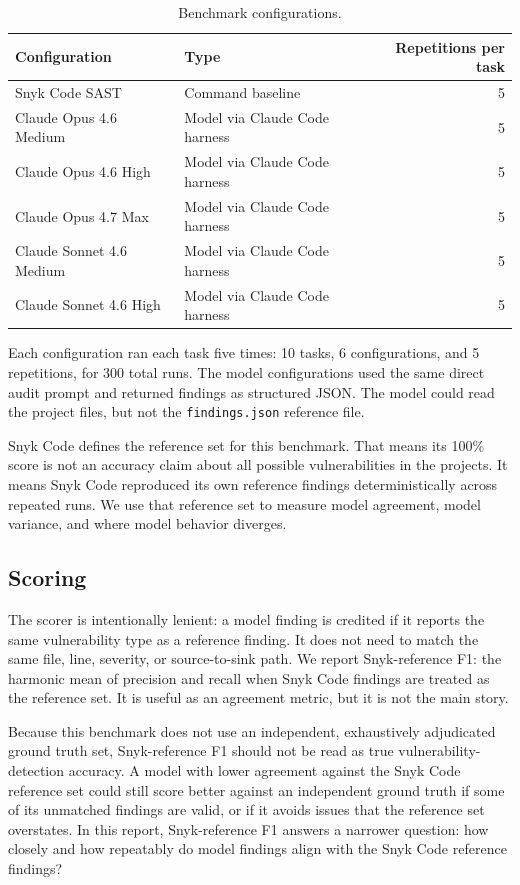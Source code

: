 \documentclass[11pt]{article}
\begin{document}
\begin{table}[htbp]
\centering
\caption{Benchmark configurations.}
\label{tab:configs}
\begin{tabular}{llr}
\toprule
Configuration & Type & Repetitions per task \\
\midrule
Snyk Code SAST & Command baseline & 5 \\
Claude Opus 4.6 Medium & Model via Claude Code harness & 5 \\
Claude Opus 4.6 High & Model via Claude Code harness & 5 \\
Claude Opus 4.7 Max & Model via Claude Code harness & 5 \\
Claude Sonnet 4.6 Medium & Model via Claude Code harness & 5 \\
Claude Sonnet 4.6 High & Model via Claude Code harness & 5 \\
\bottomrule
\end{tabular}
\end{table}

Each configuration ran each task five times: 10 tasks, 6 configurations, and 5 repetitions, for 300 total runs. The model configurations used the same direct audit prompt and returned findings as structured JSON. The model could read the project files, but not the \texttt{findings.json} reference file.

Snyk Code defines the reference set for this benchmark. That means its 100\% score is not an accuracy claim about all possible vulnerabilities in the projects. It means Snyk Code reproduced its own reference findings deterministically across repeated runs. We use that reference set to measure model agreement, model variance, and where model behavior diverges.

\subsection{Scoring}

The scorer is intentionally lenient: a model finding is credited if it reports the same vulnerability type as a reference finding. It does not need to match the same file, line, severity, or source-to-sink path. We report Snyk-reference F1: the harmonic mean of precision and recall when Snyk Code findings are treated as the reference set. It is useful as an agreement metric, but it is not the main story.

Because this benchmark does not use an independent, exhaustively adjudicated ground truth set, Snyk-reference F1 should not be read as true vulnerability-detection accuracy. A model with lower agreement against the Snyk Code reference set could still score better against an independent ground truth if some of its unmatched findings are valid, or if it avoids issues that the reference set overstates. In this report, Snyk-reference F1 answers a narrower question: how closely and how repeatably do model findings align with the Snyk Code reference findings?
\end{document}
